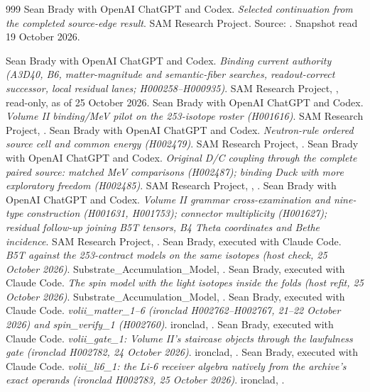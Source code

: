 \begin{thebibliography}{999}
 Sean Brady with OpenAI ChatGPT and Codex. \emph{Selected continuation from the completed source-edge result}. SAM Research Project. Source: . Snapshot read 19 October 2026.

 Sean Brady with OpenAI ChatGPT and Codex. \emph{Binding current authority (A3D40, B6, matter-magnitude and semantic-fiber searches, readout-correct successor, local residual lanes; H000258--H000935)}. SAM Research Project, , read-only, as of 25 October 2026.
 Sean Brady with OpenAI ChatGPT and Codex. \emph{Volume II binding/MeV pilot on the 253-isotope roster (H001616)}. SAM Research Project, .
 Sean Brady with OpenAI ChatGPT and Codex. \emph{Neutron-rule ordered source cell and common energy (H002479)}. SAM Research Project, .
 Sean Brady with OpenAI ChatGPT and Codex. \emph{Original D/C coupling through the complete paired source: matched MeV comparisons (H002487); binding Duck with more exploratory freedom (H002485)}. SAM Research Project, , .
 Sean Brady with OpenAI ChatGPT and Codex. \emph{Volume II grammar cross-examination and nine-type construction (H001631, H001753); connector multiplicity (H001627); residual follow-up joining B5T tensors, B4 Theta coordinates and Bethe incidence}. SAM Research Project, .
 Sean Brady, executed with Claude Code. \emph{B5T against the 253-contract models on the same isotopes (host check, 25 October 2026)}. Substrate\_Accumulation\_Model, .
 Sean Brady, executed with Claude Code. \emph{The spin model with the light isotopes inside the folds (host refit, 25 October 2026)}. Substrate\_Accumulation\_Model, .
 Sean Brady, executed with Claude Code. \emph{volii\_matter\_1--6 (ironclad H002762--H002767, 21--22 October 2026) and spin\_verify\_1 (H002760)}. ironclad, .
 Sean Brady, executed with Claude Code. \emph{volii\_gate\_1: Volume II's staircase objects through the lawfulness gate (ironclad H002782, 24 October 2026)}. ironclad, .
 Sean Brady, executed with Claude Code. \emph{volii\_li6\_1: the Li-6 receiver algebra natively from the archive's exact operands (ironclad H002783, 25 October 2026)}. ironclad, .
\end{thebibliography}
